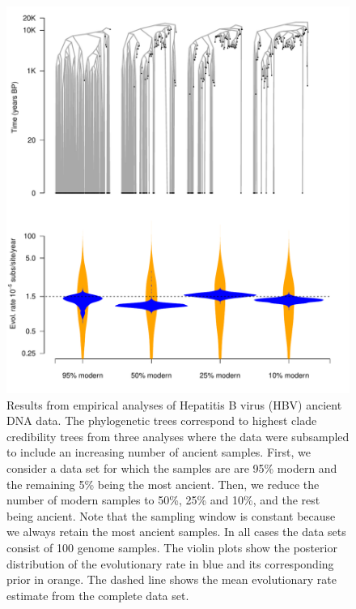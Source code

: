 \documentclass[11pt]{article}
\begin{document}
\begin{figure}[H]
    \begin{center}
        \includegraphics[scale=0.7, angle=0]{empirical_results_biased.pdf}
        \caption{Results from empirical analyses of Hepatitis B virus (HBV) ancient DNA data. The phylogenetic trees correspond to highest clade credibility trees from three analyses where the data were subsampled to include an increasing number of ancient samples. First, we consider a data set for which the samples are are 95\% modern and the remaining 5\% being the most ancient. Then, we reduce the number of modern samples to 50\%, 25\% and 10\%, and the rest being ancient. Note that the sampling window is constant because we always retain the most ancient samples. In all cases the data sets consist of 100 genome samples. The violin plots show the posterior distribution of the evolutionary rate in blue and its corresponding prior in orange. The dashed line shows the mean evolutionary rate estimate from the complete data set.}
        \label{figure:Fig7}
    \end{center}
\end{figure}
\end{document}
